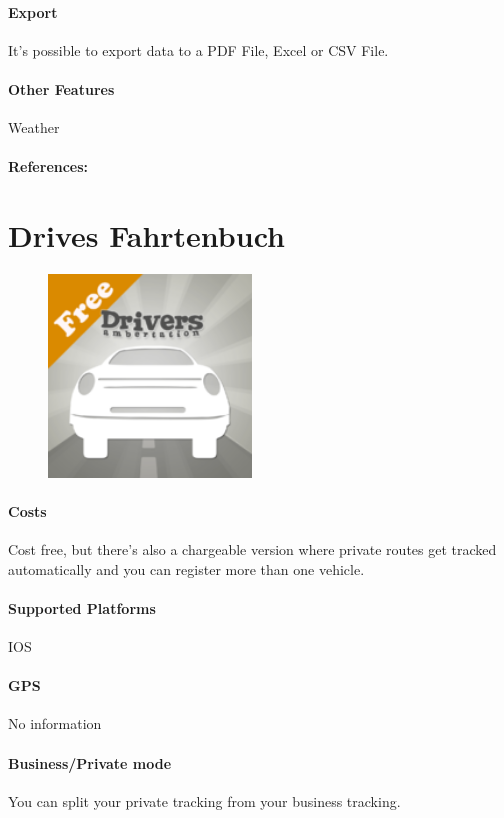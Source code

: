 \paragraph{Export} It’s possible to export data to a PDF File, Excel or CSV File.
\paragraph{Other Features} Weather
\paragraph{References:} \cite{Logbuch_App}
\newpage

\section{Drives Fahrtenbuch}
\begin{figure}
  \begin{center}
    \includegraphics[width=0.48\textwidth]{bilder/drives}
  \end{center}
\end{figure}
\paragraph{Costs} Cost free, but there's also a chargeable version where private routes get tracked automatically and you can register more than one vehicle.
\paragraph{Supported Platforms} IOS
\paragraph{GPS} No information
\paragraph{Business/Private mode} You can split your private tracking from your business tracking.
